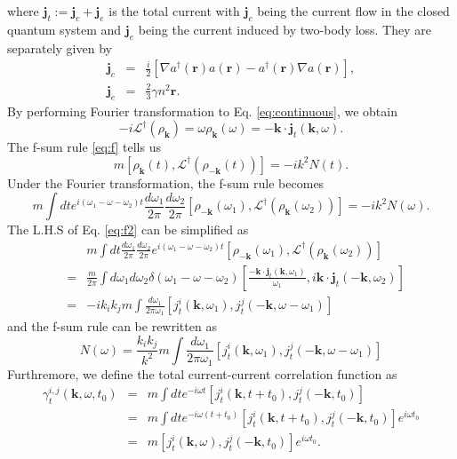 \documentclass[aps,superscriptaddress,notitlepage,longbibliography]{revtex4-1}
\begin{document}
where $\bm{j}_{t}:=\bm{j}_{c}+\bm{j}_{e}$ is the total current with
$\bm{j}_{c}$ being the current flow in the closed quantum system
and $\bm{j}_{e}$ being the current induced by two-body loss. They
are separately given by 
\begin{eqnarray}
\bm{j}_{c} & = & \frac{i}{2}[\nabla a^{\dagger}(\bm{r})a(\bm{r})-a^{\dagger}(\bm{r})\nabla a(\bm{r})],\\
\bm{j}_{e} & = & \frac{2}{3}\gamma n^{2}\bm{r}.
\end{eqnarray}
By performing Fourier transformation to Eq. \eqref{eq:continuous},
we obtain 
\begin{equation}
-i\mathcal{L}^{\dagger}(\rho_{\bm{k}})=\omega\rho_{\bm{k}}(\omega)=-\bm{k}\cdot\bm{j}_{t}(\bm{k},\omega).
\end{equation}
The f-sum rule \eqref{eq:f} tells us 
\begin{equation}
m[\rho_{\bm{k}}(t),\mathcal{L}^{\dagger}(\rho_{-\bm{k}}(t))]=-ik^{2}N(t).
\end{equation}
Under the Fourier transformation, the f-sum rule becomes 
\begin{equation}
m\int dte^{i(\omega_{1}-\omega-\omega_{2})t}\frac{d\omega_{1}}{2\pi}\frac{d\omega_{2}}{2\pi}[\rho_{-\bm{k}}(\omega_{1}),\mathcal{L}^{\dagger}(\rho_{\bm{k}}(\omega_{2}))]=-ik^{2}N(\omega).\label{eq:f2}
\end{equation}
The L.H.S of Eq. \eqref{eq:f2} can be simplified as 
\begin{eqnarray}
 &  & m\int dt\frac{d\omega_{1}}{2\pi}\frac{d\omega_{2}}{2\pi}e^{i(\omega_{1}-\omega-\omega_{2})t}[\rho_{-\bm{k}}(\omega_{1}),\mathcal{L}^{\dagger}(\rho_{\bm{k}}(\omega_{2}))]\nonumber \\
 & = & \frac{m}{2\pi}\int d\omega_{1}d\omega_{2}\delta(\omega_{1}-\omega-\omega_{2})\left[\frac{-\bm{k}\cdot\bm{j}_{t}(\bm{k},\omega_{1})}{\omega_{1}},i\bm{k}\cdot\bm{j}_{t}(-\bm{k},\omega_{2})\right]\nonumber \\
 & = & -ik_{i}k_{j}m\int\frac{d\omega_{1}}{2\pi\omega_{1}}[j_{t}^{i}(\bm{k},\omega_{1}),j_{t}^{j}(-\bm{k},\omega-\omega_{1})]
\end{eqnarray}
and the f-sum rule can be rewritten as 
\[
N(\omega)=\frac{k_{i}k_{j}}{k^{2}}m\int\frac{d\omega_{1}}{2\pi\omega_{1}}[j_{t}^{i}(\bm{k},\omega_{1}),j_{t}^{j}(-\bm{k},\omega-\omega_{1})]
\]
Furthremore, we define the total current-current correlation function
as 
\begin{eqnarray}
\gamma_{t}^{i,j}(\bm{k},\omega,t_{0}) & = & m\int dte^{-i\omega t}[j_{t}^{i}(\bm{k},t+t_{0}),j_{t}^{j}(-\bm{k},t_{0})]\nonumber \\
 & = & m\int dte^{-i\omega(t+t_{0})}[j_{t}^{i}(\bm{k},t+t_{0}),j_{t}^{j}(-\bm{k},t_{0})]e^{i\omega t_{0}}\nonumber \\
 & = & m[j_{t}^{i}(\bm{k},\omega),j_{t}^{j}(-\bm{k},t_{0})]e^{i\omega t_{0}}.
\end{eqnarray}
\end{document}
